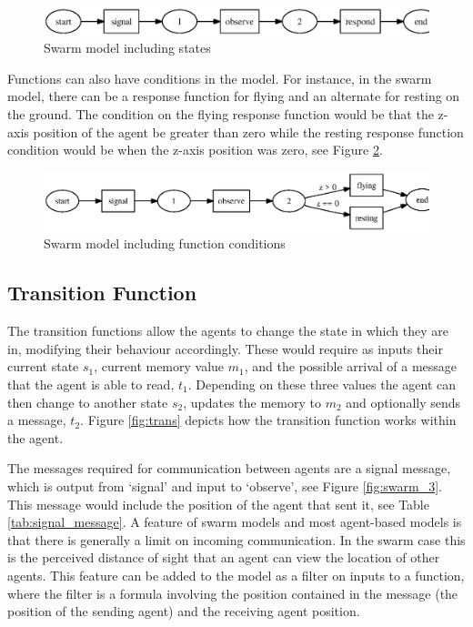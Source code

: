 \begin{figure}[ht]
\begin{center}
\includegraphics*[scale=0.65]{swarm_1.ps}
\caption{Swarm model including states}
\label{fig:swarm_1}
\end{center}
\end{figure}

Functions can also have conditions in the model. For instance, in
the swarm model, there can be a response function for flying and an
alternate for resting on the ground. The condition on the flying
response function would be that the z-axis position of the agent be
greater than zero while the resting response function condition
would be when the z-axis position was zero, see Figure
\ref{fig:swarm_2}.

\begin{figure}[ht]
\begin{center}
\includegraphics*[scale=0.65]{swarm_2.ps}
\caption{Swarm model including function conditions}
\label{fig:swarm_2}
\end{center}
\end{figure}


\subsection{Transition Function}
 The transition functions allow the agents to change the state in
 which they are in, modifying their behaviour accordingly. These would
 require as inputs their current state $s_{1}$, current memory value
 $m_{1}$, and the possible arrival of a message that the agent is able to
 read, $t_{1}$. Depending on these three values the agent can then
 change to another state $s_{2}$, updates the memory to $m_{2}$ and
 optionally sends a message, $t_{2}$. Figure
 \ref{fig:trans} depicts how the transition function
 works within the agent.

The messages required for communication between agents are a signal message,
which is output from `signal' and input to `observe', see Figure
\ref{fig:swarm_3}. This message would include the position of the agent that
sent it, see Table \ref{tab:signal_message}. A feature of swarm models and most
agent-based models is that there is generally a limit on incoming communication.
In the swarm case this is the perceived distance of sight that an agent can view the location of other
agents. This feature can be added to the model as a filter on inputs to a
function, where the filter is a formula involving the position contained in the
message (the position of the sending agent) and the receiving agent position.


